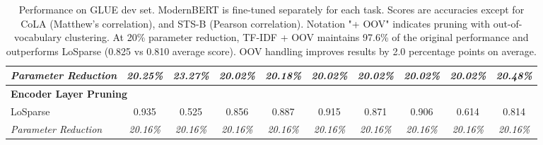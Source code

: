 \begin{table*}[h]
\begin{tabular}{l@{\hspace{25pt}}ccccccccc}
\textit{Parameter Reduction} & \textit{20.25\%} & \textit{23.27\%} & \textit{20.02\%} & \textit{20.18\%} & \textit{20.02\%} & \textit{20.02\%} & \textit{20.02\%} & \textit{20.02\%} & \textit{20.48\%} \\
\midrule
\multicolumn{10}{l}{\textbf{Encoder Layer Pruning}} \\
LoSparse & 0.935 & 0.525 & 0.856 & 0.887 & 0.915 & 0.871 & 0.906 & 0.614 & 0.814 \\
\textit{Parameter Reduction} & \textit{20.16\%} & \textit{20.16\%} & \textit{20.16\%} & \textit{20.16\%} & \textit{20.16\%} & \textit{20.16\%} & \textit{20.16\%} & \textit{20.16\%} & \textit{20.16\%} \\
\bottomrule
\end{tabular}
\caption{Performance on GLUE dev set. ModernBERT is fine-tuned separately for each task. Scores are accuracies except for CoLA (Matthew's correlation), and STS-B (Pearson correlation). Notation "+ OOV" indicates pruning with out-of-vocabulary clustering. At 20\% parameter reduction, TF-IDF + OOV maintains 97.6\% of the original performance and outperforms LoSparse (0.825 vs 0.810 average score). OOV handling improves results by 2.0 percentage points on average.}

\label{tab:results}
\end{table*}